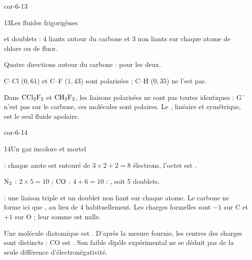 \begin{blocLivre}{cor-6-13}
\begin{corrige}{13}{Les fluides frigorigènes}
\begin{questions}
\item {} et  doublets : 4 liants autour du carbone et 3 non liants sur chaque atome de chlore ou de fluor.
\par\smallskip{}
\qquad{}
\item Quatre directions autour du carbone :  pour les deux.
\item C--Cl ($0{,}61$) et C--F ($1{,}43$) sont polarisées ; C--H ($0{,}35$) ne l'est pas.
\item Dans $\ce{CCl2F2}$ et $\ce{CH2F2}$, les liaisons polarisées ne sont pas toutes identiques : G$^{-}$ n'est pas sur le carbone, ces
molécules sont polaires. Le , linéaire et symétrique, est le seul fluide apolaire.
\end{questions}
\end{corrige}
\end{blocLivre}
\begin{blocLivre}{cor-6-14}
\begin{corrige}{14}{Un gaz incolore et mortel}
\begin{questions}
\item {} : chaque azote est entouré de $3\times2+2=8$ électrons, l'octet est .
\item $\ce{N2}$ : $2\times5=10$ ; $\ce{CO}$ : $4+6=10$ : , soit 5 doublets.
\item {} : une liaison triple et un doublet non liant sur chaque atome. Le carbone ne
forme ici que , au lieu de 4 habituellement. Les charges formelles sont $-1$ sur C et $+1$ sur O ; leur somme est nulle.
\item Une molécule diatomique est . D'après la mesure fournie, les centres des charges sont distincts : CO est
. Son faible dipôle expérimental ne se déduit pas de la seule différence d'électronégativité.
\end{questions}
\end{corrige}
\end{blocLivre}

